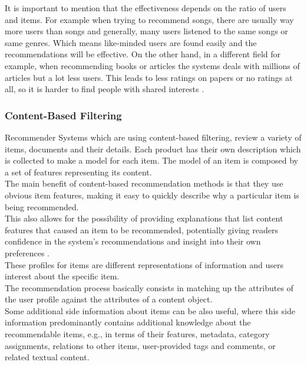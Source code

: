 \documentclass[\myFontSize,oneside,english,hidelinks,a4paper]{article}
\begin{document}
%
%
%
It is important to mention that the effectiveness depends on the ratio of users and items. For example when trying to recommend songs, there are usually way more users than songs and generally, many users listened to the same songs or same genres. Which means like-minded users are found easily and the recommendations will be effective. On the other hand, in a different field for example, when recommending books or articles the systems deals with millions of articles but a lot less users. This leads to less ratings on papers or no ratings at all, so it is harder to find people with shared interests \cite{Beel2016305}.\\








\subsubsection{Content-Based Filtering}
Recommender Systems which are using content-based filtering, review a variety of items, documents and their details. Each product has their own description which is collected to make a model for each item. The model of an item is composed by a set of features representing its content. \\
The main benefit of content-based recommendation methods is that they use obvious item features, making it easy to quickly describe why a particular item is being recommended. \cite{pub.1034486657}\\
This also allows for the possibility of providing explanations that list content features that caused an item to be recommended, potentially giving readers confidence in the system’s recommendations and insight into their own preferences \cite{Mooney2000195}. \\
These profiles for items are different representations of information and users interest about the specific item. \\
The recommendation process basically consists in matching up the attributes of the user profile against the attributes of a content object. \cite{pub.1034486657}\\
%
%
Some additional side information about items can be also useful, where this side information predominantly contains additional knowledge about the recommendable items, e.g., in terms of their features, metadata, category assignments, relations to other items, user-provided tags and comments, or related textual content. \cite{Lops2019239}\\\\
\end{document}
